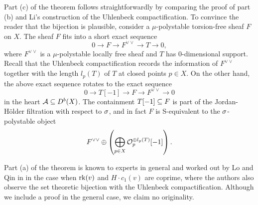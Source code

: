 \documentclass[letterpaper,12pt]{amsart}
\theoremstyle{remark}
\begin{document}
Part (c) of the theorem follows straightforwardly by comparing the proof of part (b) and Li's construction of the Uhlenbeck compactification. To convince the reader that the bijection is plausible, consider a $\mu$-polystable torsion-free sheaf $F$ on $X$. The sheaf $F$ fits into a short exact sequence
\[ 0 \to F \to F^{\vee\vee} \to T \to 0, \]
where $F^{\vee\vee}$ is a $\mu$-polystable locally free sheaf and $T$ has 0-dimensional support. Recall that the Uhlenbeck compactification records the information of $F^{\vee\vee}$ together with the length $l_p(T)$ of $T$ at closed points $p \in X$. On the other hand, the above exact sequence rotates to the exact sequence
\[ 0 \to T[-1] \to F \to F^{\vee\vee} \to 0 \]
in the heart $\mathcal{A} \subseteq D^b(X)$. The containment $T[-1] \subseteq F$ is part of the Jordan-H\"older filtration with respect to $\sigma$, and in fact $F$ is S-equivalent to the $\sigma$-polystable object
\[ F^{\vee\vee} \oplus \left(\bigoplus_{p \in X} \mathcal{O}_p^{\oplus l_p(T)}[-1]\right). \]

Part (a) of the theorem is known to experts in general and worked out by Lo and Qin in \cite{LQ} in the case when $\operatorname{\mathrm{rk}}(v)$ and $H \cdot c_1(v)$ are coprime, where the authors also observe the set theoretic bijection with the Uhlenbeck compactification. Although we include a proof in the general case, we claim no originality.
\end{document}
